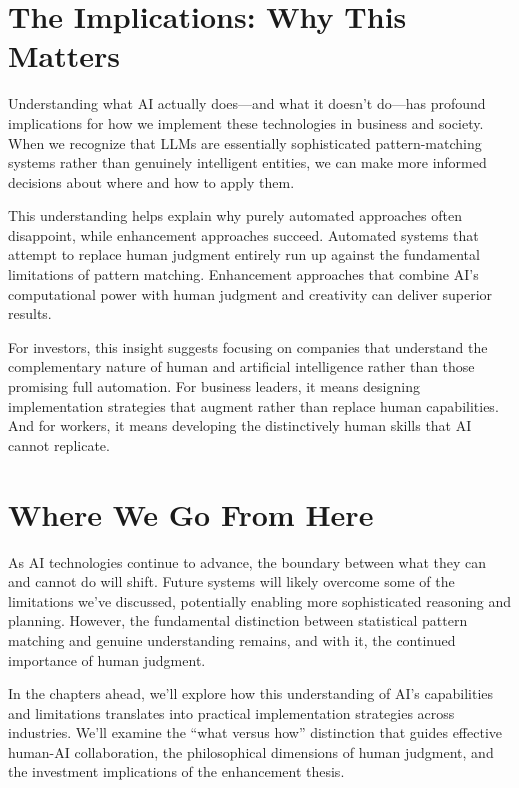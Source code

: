 \documentclass[
  Letterpaper,
]{scrbook}
\begin{document}
\section{The Implications: Why This
Matters}\label{the-implications-why-this-matters}

Understanding what AI actually does---and what it doesn't do---has
profound implications for how we implement these technologies in
business and society. When we recognize that LLMs are essentially
sophisticated pattern-matching systems rather than genuinely intelligent
entities, we can make more informed decisions about where and how to
apply them.

This understanding helps explain why purely automated approaches often
disappoint, while enhancement approaches succeed. Automated systems that
attempt to replace human judgment entirely run up against the
fundamental limitations of pattern matching. Enhancement approaches that
combine AI's computational power with human judgment and creativity can
deliver superior results.

For investors, this insight suggests focusing on companies that
understand the complementary nature of human and artificial intelligence
rather than those promising full automation. For business leaders, it
means designing implementation strategies that augment rather than
replace human capabilities. And for workers, it means developing the
distinctively human skills that AI cannot replicate.

\section{Where We Go From Here}\label{where-we-go-from-here}

As AI technologies continue to advance, the boundary between what they
can and cannot do will shift. Future systems will likely overcome some
of the limitations we've discussed, potentially enabling more
sophisticated reasoning and planning. However, the fundamental
distinction between statistical pattern matching and genuine
understanding remains, and with it, the continued importance of human
judgment.

In the chapters ahead, we'll explore how this understanding of AI's
capabilities and limitations translates into practical implementation
strategies across industries. We'll examine the ``what versus how''
distinction that guides effective human-AI collaboration, the
philosophical dimensions of human judgment, and the investment
implications of the enhancement thesis.
\end{document}
